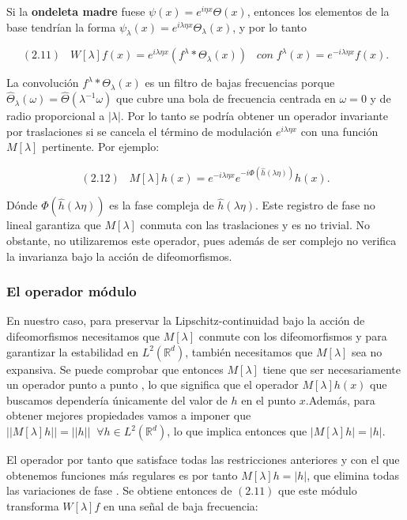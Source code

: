 \noindent Si la \textbf{ondeleta madre} fuese $\psi(x)=e^{i\eta x}\Theta(x)$, entonces los elementos de la base tendrían la forma $\psi_\lambda(x)=e^{i\lambda\eta x}\Theta_\lambda(x)$, y por lo tanto 

$$(2.11) \; \; \; W[\lambda]f(x)=e^{i\lambda\eta x}(f^\lambda \ast \Theta_\lambda(x)) \; \; \; con \; f^\lambda(x)=e^{-i\lambda\eta x}f(x).$$

\noindent La convolución $f^\lambda \ast \Theta_\lambda(x)$ es un filtro de bajas frecuencias porque $\widehat{\Theta}_\lambda(\omega)=\widehat{\Theta}(\lambda^{-1} \omega)$ que cubre una bola de frecuencia centrada en $\omega=0$ y de radio proporcional a $|\lambda|$. Por lo tanto se podría obtener un operador invariante por traslaciones si se cancela el término de modulación $e^{i\lambda\eta x}$ con una función $M[\lambda]$ pertinente. Por ejemplo: 

$$(2.12) \;\;\; M[\lambda]h(x)=e^{-i\lambda\eta x} e^{-i \Phi(\widehat{h}(\lambda\eta))}h(x).$$

\noindent Dónde $\Phi(\widehat{h}(\lambda\eta))$ es la fase compleja de $\widehat{h}(\lambda\eta)$. Este registro de fase no lineal garantiza que $M[\lambda]$ conmuta con las traslaciones y es no trivial. No obstante, no utilizaremos este operador, pues además de ser complejo no verifica la invarianza bajo la acción de difeomorfismos.

\subsubsection{El operador módulo}

\noindent En nuestro caso, para preservar la Lipschitz-continuidad bajo la acción de difeomorfismos necesitamos que $M[\lambda]$ conmute con los difeomorfismos y para garantizar la estabilidad en $L^2(\mathbb{R}^d)$, también necesitamos que $M[\lambda]$ sea no expansiva. Se puede comprobar que entonces $M[\lambda]$ tiene que ser necesariamente un operador punto a punto \cite{JBrunaOperatorsCommutingDiff}, lo que significa que el operador $M[\lambda]h(x)$ que buscamos dependería únicamente del valor de $h$ en el punto $x$.Además, para obtener mejores propiedades vamos a imponer que $||M[\lambda]h||=||h|| \; \; \forall h \in L^2(\mathbb{R}^d)$, lo que implica entonces que $|M[\lambda]h|=|h|$. 

\medskip

\noindent El operador por tanto que satisface todas las restricciones anteriores y con el que obtenemos funciones más regulares es por tanto $M[\lambda]h=|h|$, que elimina todas las variaciones de fase \cite{bruna2013invariant}. Se obtiene entonces de $(2.11)$ que este módulo transforma $W[\lambda]f$ en una señal de baja frecuencia:

